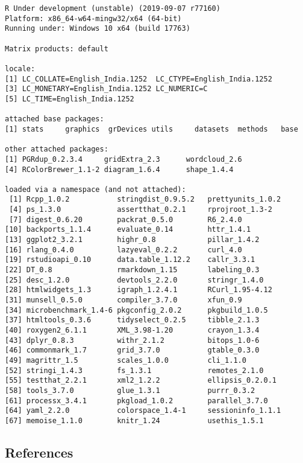 \documentclass[]{article}
\begin{document}
\begin{verbatim}
R Under development (unstable) (2019-09-07 r77160)
Platform: x86_64-w64-mingw32/x64 (64-bit)
Running under: Windows 10 x64 (build 17763)

Matrix products: default

locale:
[1] LC_COLLATE=English_India.1252  LC_CTYPE=English_India.1252   
[3] LC_MONETARY=English_India.1252 LC_NUMERIC=C                  
[5] LC_TIME=English_India.1252    

attached base packages:
[1] stats     graphics  grDevices utils     datasets  methods   base     

other attached packages:
[1] PGRdup_0.2.3.4     gridExtra_2.3      wordcloud_2.6     
[4] RColorBrewer_1.1-2 diagram_1.6.4      shape_1.4.4       

loaded via a namespace (and not attached):
 [1] Rcpp_1.0.2           stringdist_0.9.5.2   prettyunits_1.0.2   
 [4] ps_1.3.0             assertthat_0.2.1     rprojroot_1.3-2     
 [7] digest_0.6.20        packrat_0.5.0        R6_2.4.0            
[10] backports_1.1.4      evaluate_0.14        httr_1.4.1          
[13] ggplot2_3.2.1        highr_0.8            pillar_1.4.2        
[16] rlang_0.4.0          lazyeval_0.2.2       curl_4.0            
[19] rstudioapi_0.10      data.table_1.12.2    callr_3.3.1         
[22] DT_0.8               rmarkdown_1.15       labeling_0.3        
[25] desc_1.2.0           devtools_2.2.0       stringr_1.4.0       
[28] htmlwidgets_1.3      igraph_1.2.4.1       RCurl_1.95-4.12     
[31] munsell_0.5.0        compiler_3.7.0       xfun_0.9            
[34] microbenchmark_1.4-6 pkgconfig_2.0.2      pkgbuild_1.0.5      
[37] htmltools_0.3.6      tidyselect_0.2.5     tibble_2.1.3        
[40] roxygen2_6.1.1       XML_3.98-1.20        crayon_1.3.4        
[43] dplyr_0.8.3          withr_2.1.2          bitops_1.0-6        
[46] commonmark_1.7       grid_3.7.0           gtable_0.3.0        
[49] magrittr_1.5         scales_1.0.0         cli_1.1.0           
[52] stringi_1.4.3        fs_1.3.1             remotes_2.1.0       
[55] testthat_2.2.1       xml2_1.2.2           ellipsis_0.2.0.1    
[58] tools_3.7.0          glue_1.3.1           purrr_0.3.2         
[61] processx_3.4.1       pkgload_1.0.2        parallel_3.7.0      
[64] yaml_2.2.0           colorspace_1.4-1     sessioninfo_1.1.1   
[67] memoise_1.1.0        knitr_1.24           usethis_1.5.1       
\end{verbatim}

\hypertarget{references}{%
\subsection*{References}\label{references}}
\end{document}
